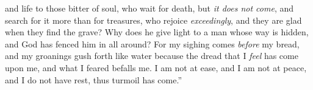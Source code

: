 \begin{biblechapter}
and life to those bitter of soul,
\verse who wait for death, but \textit{it does not come}, 
and search for it more than for treasures,
\verse who rejoice \textit{exceedingly}, 
and they are glad when they find the grave?
\verse Why does he give light to a man whose way is hidden, 
and God has fenced him in all around?
\verse For my sighing comes \textit{before} my bread, 
and my groanings gush forth like water
\verse because the dread that I \textit{feel} has come upon me, 
and what I feared befalls me.
\verse I am not at ease, and I am not at peace, 
and I do not have rest, thus turmoil has come.”
\end{biblechapter}

